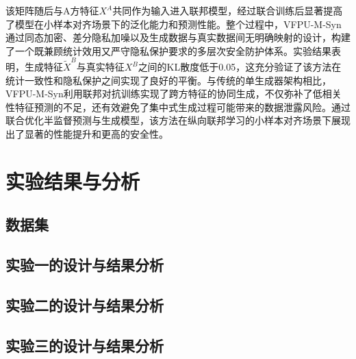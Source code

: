 该矩阵随后与A方特征$X^A$共同作为输入进入联邦模型，经过联合训练后显著提高了模型在小样本对齐场景下的泛化能力和预测性能。整个过程中，VFPU-M-Syn通过同态加密、差分隐私加噪以及生成数据与真实数据间无明确映射的设计，构建了一个既兼顾统计效用又严守隐私保护要求的多层次安全防护体系。实验结果表明，生成特征$\tilde{X}^B$与真实特征$X^B$之间的KL散度低于0.05，这充分验证了该方法在统计一致性和隐私保护之间实现了良好的平衡。与传统的单生成器架构相比，VFPU-M-Syn利用联邦对抗训练实现了跨方特征的协同生成，不仅弥补了低相关性特征预测的不足，还有效避免了集中式生成过程可能带来的数据泄露风险。通过联合优化半监督预测与生成模型，该方法在纵向联邦学习的小样本对齐场景下展现出了显著的性能提升和更高的安全性。

\section{实验结果与分析}
\subsection{数据集}
\subsection{实验一的设计与结果分析}
\subsection{实验二的设计与结果分析}
\subsection{实验三的设计与结果分析}